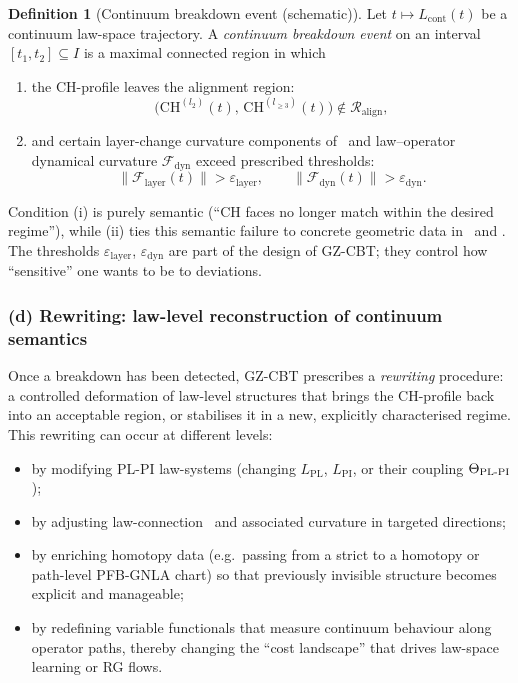 \documentclass[11pt]{book}
\theoremstyle{plain}
\theoremstyle{definition}
\newtheorem{definition}[theorem]{Definition} \theoremstyle{remark}
\begin{document}
\begin{definition}[Continuum breakdown event (schematic)]
  Let $t\mapsto L_{\mathrm{cont}}(t)$ be a continuum law-space
  trajectory. A \emph{continuum breakdown event} on an interval
  $[t_1,t_2]\subseteq I$ is a maximal connected region in which
  \begin{enumerate}[label=\roman*)]
    \item the CH-profile leaves the alignment region:
          \[
             \bigl(
               \mathrm{CH}^{(l_2)}(t),\,
               \mathrm{CH}^{(l_{\ge3})}(t)
             \bigr)
             \notin
             \mathcal{R}_{\mathrm{align}},
          \]
    \item and certain layer-change curvature components of \GZLCurv\
          and law--operator dynamical curvature $\mathcal{F}_{\mathrm{dyn}}$
          exceed prescribed thresholds:
          \[
             \|\mathcal{F}_{\mathrm{layer}}(t)\|
             > \varepsilon_{\mathrm{layer}},
             \qquad
             \|\mathcal{F}_{\mathrm{dyn}}(t)\|
             > \varepsilon_{\mathrm{dyn}}.
          \]
  \end{enumerate}
\end{definition}

Condition (i) is purely semantic (“CH faces no longer match within the
desired regime”), while (ii) ties this semantic failure to concrete
geometric data in \GZTLC\ and \GZLCurv. The thresholds
$\varepsilon_{\mathrm{layer}}$, $\varepsilon_{\mathrm{dyn}}$ are
part of the design of GZ-CBT; they control how “sensitive” one wants
to be to deviations.



\subsubsection*{(d) Rewriting: law-level reconstruction of continuum semantics}

Once a breakdown has been detected, GZ-CBT prescribes a \emph{rewriting}
procedure: a controlled deformation of law-level structures that brings
the CH-profile back into an acceptable region, or stabilises it in a
new, explicitly characterised regime. This rewriting can occur at
different levels:

\begin{itemize}
  \item by modifying PL-PI law-systems (changing $L_{\mathrm{PL}}$,
        $L_{\mathrm{PI}}$, or their coupling $\Theta_{\mathrm{PL\text- PI}}$);
  \item by adjusting law-connection \GZLOC\ and associated curvature
        in targeted directions;
  \item by enriching homotopy data (e.g.\ passing from a strict to a
        homotopy or path-level PFB-GNLA chart) so that previously
        invisible structure becomes explicit and manageable;
  \item by redefining variable functionals that measure continuum
        behaviour along operator paths, thereby changing the “cost
        landscape” that drives law-space learning or RG flows.
\end{itemize}
\end{document}
